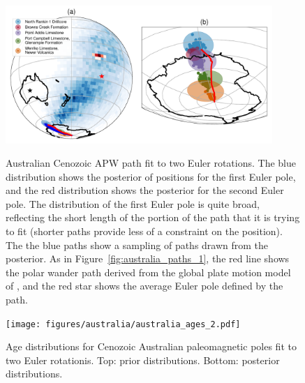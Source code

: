 \documentclass[preprint,12pt,authoryear]{elsarticle}
\begin{document}
\begin{figure}
\includegraphics[width=0.9\textwidth]{figures/australia/australia_paths_2.pdf}
\label{fig:australia_paths_2}
\caption[Australian Cenozoic APW path fit to two Euler rotations.]{Australian Cenozoic APW path fit to two Euler rotations. The blue distribution shows the posterior of positions for the first Euler pole, and the red distribution shows the posterior for the second Euler pole. The distribution of the first Euler pole is quite broad, reflecting the short length of the portion of the path that it is trying to fit (shorter paths provide less of a constraint on the position). The the blue paths show a sampling of paths drawn from the posterior. As in Figure~\ref{fig:australia_paths_1}, the red line shows the polar wander path derived from the global plate motion model of \citet{seton2012global}, and the red star shows the average Euler pole defined by the \citet{seton2012global} path.}
\end{figure}
\begin{figure}
\texttt{[image: figures/australia/australia\_ages\_2.pdf]}
\caption[Age distributions for Cenozoic Australian paleomagnetic poles fit to two Euler rotations.] {Age distributions for Cenozoic Australian paleomagnetic poles fit to two Euler rotationis. Top: prior distributions. Bottom: posterior distributions.}
\label{fig:australia_ages_2}
\end{figure}
\end{document}
